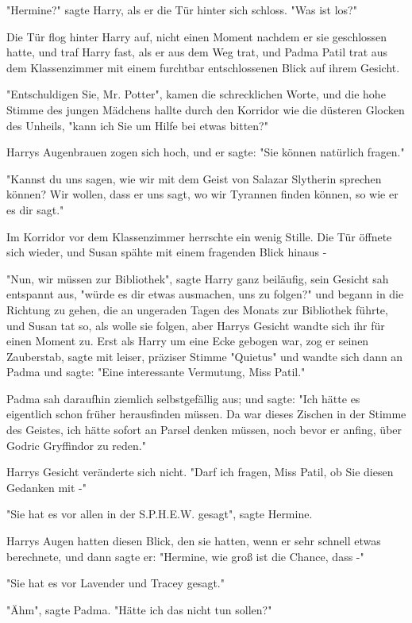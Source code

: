 {"Hermine?" sagte Harry, als er die Tür hinter sich schloss. "Was ist los?"

Die Tür flog hinter Harry auf, nicht einen Moment nachdem er sie geschlossen hatte, und traf Harry fast, als er aus dem Weg trat, und Padma Patil trat aus dem Klassenzimmer mit einem furchtbar entschlossenen Blick auf ihrem Gesicht.

"Entschuldigen Sie, Mr. Potter", kamen die schrecklichen Worte, und die hohe Stimme des jungen Mädchens hallte durch den Korridor wie die düsteren Glocken des Unheils, "kann ich Sie um Hilfe bei etwas bitten?"

Harrys Augenbrauen zogen sich hoch, und er sagte: "Sie können natürlich fragen."

"Kannst du uns sagen, wie wir mit dem Geist von Salazar Slytherin sprechen können? Wir wollen, dass er uns sagt, wo wir Tyrannen finden können, so wie er es dir sagt."

Im Korridor vor dem Klassenzimmer herrschte ein wenig Stille. Die Tür öffnete sich wieder, und Susan spähte mit einem fragenden Blick hinaus -

"Nun, wir müssen zur Bibliothek", sagte Harry ganz beiläufig, sein Gesicht sah entspannt aus, "würde es dir etwas ausmachen, uns zu folgen?" und begann in die Richtung zu gehen, die an ungeraden Tagen des Monats zur Bibliothek führte, und Susan tat so, als wolle sie folgen, aber Harrys Gesicht wandte sich ihr für einen Moment zu. Erst als Harry um eine Ecke gebogen war, zog er seinen Zauberstab, sagte mit leiser, präziser Stimme "Quietus" und wandte sich dann an Padma und sagte: "Eine interessante Vermutung, Miss Patil."

Padma sah daraufhin ziemlich selbstgefällig aus; und sagte: "Ich hätte es eigentlich schon früher herausfinden müssen. Da war dieses Zischen in der Stimme des Geistes, ich hätte sofort an Parsel denken müssen, noch bevor er anfing, über Godric Gryffindor zu reden."

Harrys Gesicht veränderte sich nicht. "Darf ich fragen, Miss Patil, ob Sie diesen Gedanken mit -"

"Sie hat es vor allen in der S.P.H.E.W. gesagt", sagte Hermine.

Harrys Augen hatten diesen Blick, den sie hatten, wenn er sehr schnell etwas berechnete, und dann sagte er: "Hermine, wie groß ist die Chance, dass -"

"Sie hat es vor Lavender und Tracey gesagt."

"Ähm", sagte Padma. "Hätte ich das nicht tun sollen?"

}
